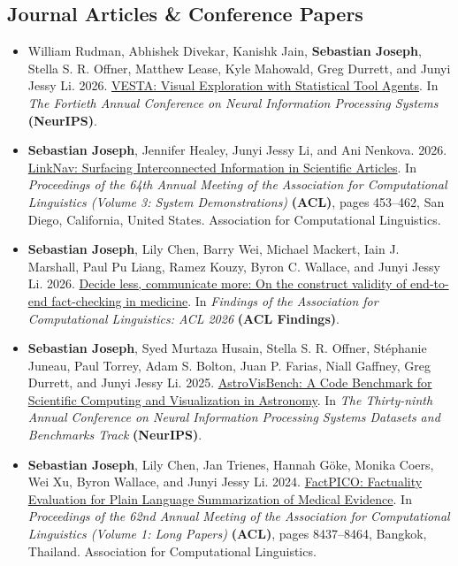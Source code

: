 \documentclass[11pt]{article}
\begin{document}
\subsection{Journal Articles \& Conference Papers}
\begin{itemize}
    \item {
William Rudman, Abhishek Divekar, Kanishk Jain, \textbf{Sebastian Joseph}, Stella S. R. Offner, Matthew Lease, Kyle Mahowald, Greg Durrett, and Junyi Jessy Li. 2026. \href{https://arxiv.org/abs/2606.00384}{VESTA: Visual Exploration with Statistical Tool Agents}. In \textit{The Fortieth Annual Conference on Neural Information Processing Systems} \textbf{(NeurIPS)}.
 }
    \item {
\textbf{Sebastian Joseph}, Jennifer Healey, Junyi Jessy Li, and Ani Nenkova. 2026. \href{https://aclanthology.org/2026.acl-demo.45}{LinkNav: Surfacing Interconnected Information in Scientific Articles}. In \textit{Proceedings of the 64th Annual Meeting of the Association for Computational Linguistics (Volume 3: System Demonstrations)} \textbf{(ACL)}, pages 453–462, San Diego, California, United States. Association for Computational Linguistics.
 }
    \item {
\textbf{Sebastian Joseph}, Lily Chen, Barry Wei, Michael Mackert, Iain J. Marshall, Paul Pu Liang, Ramez Kouzy, Byron C. Wallace, and Junyi Jessy Li. 2026. \href{https://aclanthology.org/2026.findings-acl.496}{Decide less, communicate more: On the construct validity of end-to-end fact-checking in medicine}. In \textit{Findings of the Association for Computational Linguistics: ACL 2026} \textbf{(ACL Findings)}.
 }
    \item {
   \textbf{Sebastian Joseph}, Syed Murtaza Husain, Stella S. R. Offner, Stéphanie Juneau, Paul Torrey, Adam S. Bolton, Juan P. Farias, Niall Gaffney, Greg Durrett, and Junyi Jessy Li. 2025. \href{https://openreview.net/forum?id=qXiTFAgEx4}{AstroVisBench: A Code Benchmark for Scientific Computing and Visualization in Astronomy}. In \textit{The Thirty-ninth Annual Conference on Neural Information Processing Systems Datasets and Benchmarks Track} \textbf{(NeurIPS)}.
    }
    \item { 
\textbf{Sebastian Joseph}, Lily Chen, Jan Trienes, Hannah Göke, Monika Coers, Wei Xu, Byron Wallace, and Junyi Jessy Li. 2024. \href{https://aclanthology.org/2024.acl-long.459}{FactPICO: Factuality Evaluation for Plain Language Summarization of Medical Evidence}. In \textit{Proceedings of the 62nd Annual Meeting of the Association for Computational Linguistics (Volume 1: Long Papers)} \textbf{(ACL)}, pages 8437–8464, Bangkok, Thailand. Association for Computational Linguistics.
}
\end{itemize}
\end{document}
